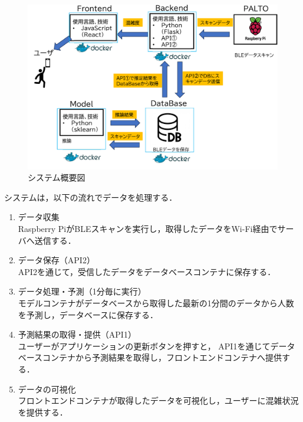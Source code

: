 \begin{figure}[tb]
	\centering
	\includegraphics[width=12cm]{./outline_drawing.pdf}
	\caption{システム概要図}
	\label{fig:システム概要図}
\end{figure}

システムは，以下の流れでデータを処理する．

\begin{enumerate}
	\item データ収集　\\
	Raspberry PiがBLEスキャンを実行し，取得したデータをWi-Fi経由でサーバへ送信する．
	
	\item データ保存（API2） \\
	API2を通じて，受信したデータをデータベースコンテナに保存する．
	
	\item データ処理・予測（1分毎に実行） \\
	モデルコンテナがデータベースから取得した最新の1分間のデータから人数を予測し，データベースに保存する．
	
	\item 予測結果の取得・提供（API1） \\
	ユーザーがアプリケーションの更新ボタンを押すと，
	API1を通じてデータベースコンテナから予測結果を取得し，フロントエンドコンテナへ提供する．
	
	\item データの可視化 \\
	フロントエンドコンテナが取得したデータを可視化し，ユーザーに混雑状況を提供する．
\end{enumerate}

